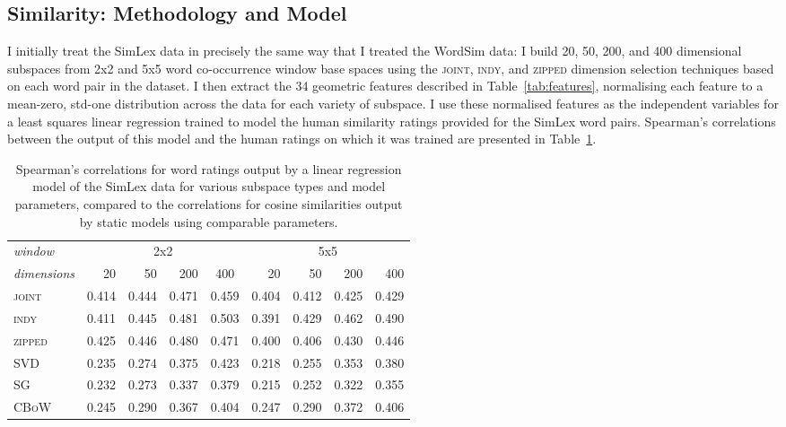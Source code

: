 \subsection{Similarity: Methodology and Model} \label{sec:simmeth}
I initially treat the SimLex data in precisely the same way that I treated the WordSim data: I build 20, 50, 200, and 400 dimensional subspaces from 2x2 and 5x5 word co-occurrence window base spaces using the \textsc{joint}, \textsc{indy}, and \textsc{zipped} dimension selection techniques based on each word pair in the dataset.  I then extract the 34 geometric features described in Table~\ref{tab:features}, normalising each feature to a mean-zero, std-one distribution across the data for each variety of subspace.  I use these normalised features as the independent variables for a least squares linear regression trained to model the human similarity ratings provided for the SimLex word pairs.  Spearman's correlations between the output of this model and the human ratings on which it was trained are presented in Table~\ref{tab:similar}.

\begin{table}
\centering
\begin{tabular}{lrrrr|rrrr}
\hline
\emph{window} & \multicolumn{4}{c}{2x2} & \multicolumn{4}{c}{5x5} \\
\emph{dimensions} & 20 & 50 & 200 & \multicolumn{1}{c}{400} & 20 & 50 & 200 & 400 \\
\hline
\textsc{joint} & 0.414 & 0.444 & 0.471 & 0.459 & 0.404 & 0.412 & 0.425 & 0.429 \\
\textsc{indy} & 0.411 & 0.445 & 0.481 & 0.503 & 0.391 & 0.429 & 0.462 & 0.490 \\
\textsc{zipped} & 0.425 & 0.446 & 0.480 & 0.471 & 0.400 & 0.406 & 0.430 & 0.446 \\
\textsc{SVD} & 0.235 & 0.274 & 0.375 & 0.423 & 0.218 & 0.255 & 0.353 & 0.380 \\
\textsc{SG} & 0.232 & 0.273 & 0.337 & 0.379 & 0.215 & 0.252 & 0.322 & 0.355 \\
\textsc{CBoW} & 0.245 & 0.290 & 0.367 & 0.404 & 0.247 & 0.290 & 0.372 & 0.406 \\
\hline
\end{tabular}
\caption[Spearman's Correlations for Similarity]{Spearman's correlations for word ratings output by a linear regression model of the SimLex data for various subspace types and model parameters, compared to the correlations for cosine similarities output by static models using comparable parameters.}
\label{tab:similar}
\end{table}

